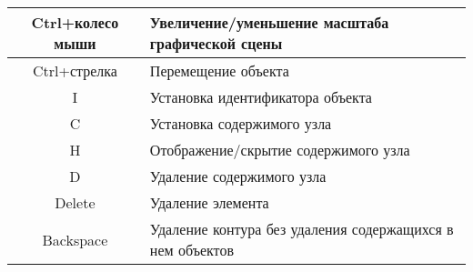 \begin{tabular}{|c|l|}
\hline
Ctrl+колесо мыши & Увеличение/уменьшение масштаба графической сцены \\
\hline
Ctrl+стрелка & Перемещение объекта \\
\hline
I & Установка идентификатора объекта \\
\hline
C & Установка содержимого узла \\
\hline
H & Отображение/скрытие содержимого узла \\
\hline
D & Удаление содержимого узла \\
\hline
Delete & Удаление элемента \\
\hline
Backspace & Удаление контура без удаления содержащихся в нем объектов \\
\hline
\end{tabular}
